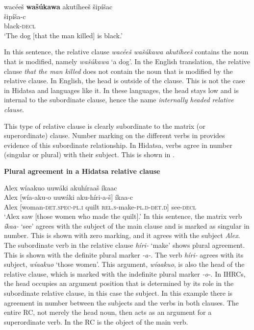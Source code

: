 \documentclass[output=paper]{LSP/langsci}
\begin{document}
\glll {\ob}wac\'ee\v{s} \textbf{wa\v{s}\'ukawa} akut\'ihee\v{s}{\cb} \v{s}ip\'i\v{s}ac\\
[wac\'ee-\v{s}    \textbf{wa\v{s}\'uka-wa}  aku-t\'i-hee-\v{s}]  \v{s}ip\'i\v{s}a-c\\
[man-\textsc{det.d} \textbf{dog-\textsc{det.i}}  \textsc{rel.s}-die-\textsc{3.caus.d.sg}-\textsc{det.d}] black-\textsc{decl}\\
\trans `The dog [that the man killed] is black.' 
\z

In this sentence, the relative clause \textit{wac\'ee\v{s} wa\v{s}\'ukawa akut\'ihee\v{s}} contains the noun that is modified, namely \textit{wa\v{s}\'ukawa} `a dog'. In the English translation, the relative clause \textit{that the man killed} does not contain the noun that is modified by the relative clause. In English, the head is outside of the clause. This is not the case in Hidatsa and languages like it.  In these languages, the head stays low and is internal to the subordinate clause, hence the name \textit{internally headed relative clause}.
	
This type of relative clause is clearly subordinate to the matrix (or superordinate) clause. Number marking on the different verbs in  provides evidence of this subordinate relationship. In Hidatsa, verbs agree in number (singular or plural) with their subject. This is shown in .

\ea \textbf{Plural agreement in a Hidatsa relative clause} \label{boyle12}

\glll Alex {\ob}w\'iaakuo uuw\'aki akuh\'iraa\v{s}{\cb} \'ikaac\\
Alex [w\'ia-aku-o    uuw\'aki  aku-h\'iri-a-\v{s}]  \'ikaa-c\\
Alex [woman-\textsc{det.spec-pl.i} quilt  \textsc{rel.s}-make-\textsc{pl.d}-\textsc{det.d}] see-\textsc{decl}\\
\trans `Alex saw [those women who made the quilt].' 
\z
In this sentence, the matrix verb \textit{\'ikaa-} `see' agrees with the subject of the main clause and is marked as singular in number. This is shown with zero marking, and it agrees with the subject \textit{Alex}. The subordinate verb in the relative clause \textit{h\'iri-} `make' shows plural agreement. This is shown with the definite plural marker \textit{-a-}.  The verb \textit{h\'iri-} agrees with its subject, \textit{w\'iaakuo} `those women'. This argument, \textit{w\'iaakuo}, is also the head of the relative clause, which is marked with the indefinite plural marker \textit{-o-}. In IHRCs, the head occupies an argument position that is determined by its role in the subordinate relative clause, in this case the subject. In this example there is agreement in number between the subjects and the verbs in both clauses. The entire RC, not merely the head noun, then acts as an argument for a superordinate verb. In  the RC is the object of the main verb.
\end{document}
